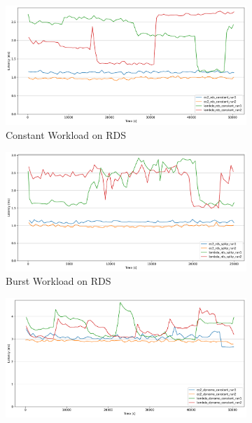 \begin{figure}[h]
	\begin{subfigure}{0.49\linewidth}
		\centering
		\includegraphics[width=\linewidth]{./fig/ts-rds-constant.pdf}
		\caption{Constant Workload on RDS}
		\label{fig:ts_rds_const}
	\end{subfigure}
	\hfill
	\begin{subfigure}{0.49\linewidth}
		\centering
		\includegraphics[width=\linewidth]{./fig/ts-rds-bursty.pdf}
		\caption{Burst Workload on RDS}
		\label{fig:ts_rds_bursty}
	\end{subfigure}
	\vfill
	\begin{subfigure}{0.49\linewidth}
		\centering
		\includegraphics[width=\linewidth]{./fig/ts-dynamo-constant.pdf}

\end{subfigure}
\end{figure}
